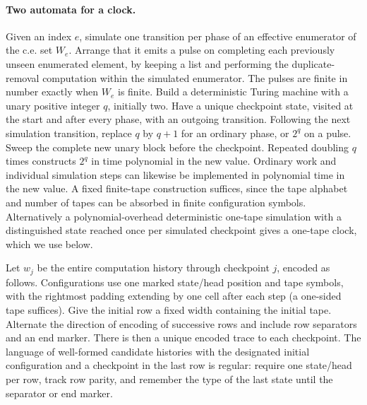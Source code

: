 \documentclass[11pt]{article}
\begin{document}
\paragraph{Two automata for a clock.} Given an index $e$, simulate one transition per phase of an effective enumerator of the c.e. set $W_e$. Arrange that it emits a pulse on completing each previously unseen enumerated element, by keeping a list and performing the duplicate-removal computation within the simulated enumerator. The pulses are finite in number exactly when $W_e$ is finite. Build a deterministic Turing machine with a unary positive integer $q$, initially two. Have a unique checkpoint state, visited at the start and after every phase, with an outgoing transition. Following the next simulation transition, replace $q$ by $q+1$ for an ordinary phase, or $2^q$ on a pulse. Sweep the complete new unary block before the checkpoint. Repeated doubling $q$ times constructs $2^q$ in time polynomial in the new value. Ordinary work and individual simulation steps can likewise be implemented in polynomial time in the new value. A fixed finite-tape construction suffices, since the tape alphabet and number of tapes can be absorbed in finite configuration symbols. Alternatively a polynomial-overhead deterministic one-tape simulation with a distinguished state reached once per simulated checkpoint gives a one-tape clock, which we use below.

Let $w_j$ be the entire computation history through checkpoint $j$, encoded as follows. Configurations use one marked state/head position and tape symbols, with the rightmost padding extending by one cell after each step (a one-sided tape suffices). Give the initial row a fixed width containing the initial tape. Alternate the direction of encoding of successive rows and include row separators and an end marker. There is then a unique encoded trace to each checkpoint. The language of well-formed candidate histories with the designated initial configuration and a checkpoint in the last row is regular: require one state/head per row, track row parity, and remember the type of the last state until the separator or end marker.
\end{document}
